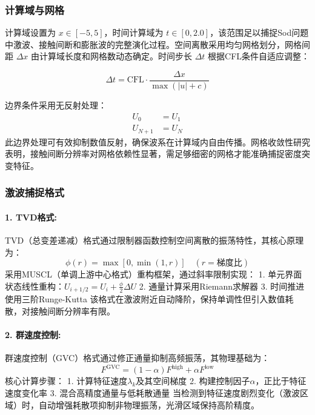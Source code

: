 \documentclass[UTF8]{ctexart}
\begin{document}
\subsubsection{计算域与网格}

计算域设置为 $x \in [-5, 5]$，时间计算域为 $t \in [0, 2.0]$，该范围足以捕捉Sod问题中激波、接触间断和膨胀波的完整演化过程。空间离散采用均匀网格划分，网格间距 $\Delta x$ 由计算域长度和网格数动态确定。时间步长 $\Delta t$ 根据CFL条件自适应调整：

\begin{equation}
\Delta t = \text{CFL} \cdot \frac{\Delta x}{\max(|u| + c)}
\end{equation}

边界条件采用无反射处理：
\begin{align*}
U_0 &= U_1 \\
U_{N+1} &= U_N
\end{align*}
此边界处理可有效抑制数值反射，确保波系在计算域内自由传播。网格收敛性研究表明，接触间断分辨率对网格依赖性显著，需足够细密的网格才能准确捕捉密度突变特征。

\subsubsection{激波捕捉格式}
\paragraph{1. TVD格式:}
TVD（总变差递减）格式通过限制器函数控制空间离散的振荡特性，其核心原理为：
\begin{equation}
\phi(r) = \max[0, \min(1,r)] \quad (r=\text{梯度比})
\end{equation}
采用MUSCL（单调上游中心格式）重构框架，通过斜率限制实现：
1. 单元界面状态线性重构：$U_{i+1/2} = U_i + \frac{\phi}{2}\Delta U$
2. 通量计算采用Riemann求解器
3. 时间推进使用三阶Runge-Kutta
该格式在激波附近自动降阶，保持单调性但引入数值耗散，对接触间断分辨率有限。

\paragraph{2. 群速度控制:}
群速度控制（GVC）格式通过修正通量抑制高频振荡，其物理基础为：
\begin{equation}
F^{\text{GVC}} = (1-\alpha)F^{\text{high}} + \alpha F^{\text{low}}
\end{equation}
核心计算步骤：
1. 计算特征速度$\lambda_k$及其空间梯度
2. 构建控制因子$\alpha$，正比于特征速度变化率
3. 混合高精度通量与低耗散通量
当检测到特征速度剧烈变化（激波区域）时，自动增强耗散项抑制非物理振荡，光滑区域保持高阶精度。
\end{document}
